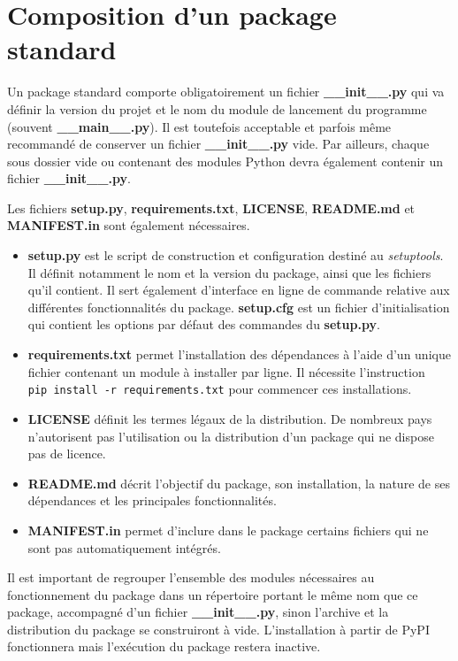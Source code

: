 \documentclass[twoside,a4paper,11pt,frenchb,openany]{report}
\begin{document}
\section{Composition d'un package standard}

Un package standard comporte obligatoirement un fichier \textbf{\_\_init\_\_.py} qui va définir la version du projet et le nom du module de lancement du programme (souvent \textbf{\_\_main\_\_.py}). Il est toutefois acceptable et parfois même recommandé de conserver un fichier \textbf{\_\_init\_\_.py} vide. Par ailleurs, chaque sous dossier vide ou contenant des modules Python devra également contenir un fichier \textbf{\_\_init\_\_.py}.

Les fichiers \textbf{setup.py}, \textbf{requirements.txt}, \textbf{LICENSE},  \textbf{README.md} et \textbf{MANIFEST.in} sont également nécessaires.  
\begin{itemize}
\item \textbf{setup.py} est le script de construction et configuration destiné au \textit{setuptools}. Il définit notamment le nom et la version du package, ainsi que les fichiers qu'il contient. Il sert également d'interface en ligne de commande relative aux différentes fonctionnalités du package. \textbf{setup.cfg} est un fichier d'initialisation qui contient les options par défaut des commandes du \textbf{setup.py}.
\item \textbf{requirements.txt} permet l'installation des dépendances à l'aide d'un unique fichier contenant un module à installer par ligne. Il nécessite l'instruction 
\texttt{  pip install -r requirements.txt}
pour commencer ces installations.
\item \textbf{LICENSE} définit les termes légaux de la distribution. De nombreux pays n'autorisent pas l'utilisation ou la distribution d'un package qui ne dispose pas de licence.
\item \textbf{README.md} décrit l'objectif du package, son installation, la nature de ses dépendances et les principales fonctionnalités.
\item \textbf{MANIFEST.in} permet d'inclure dans le package certains fichiers qui ne sont pas automatiquement intégrés. 
\end{itemize}

Il est important de regrouper l'ensemble des modules nécessaires au fonctionnement du package dans un répertoire portant le même nom que ce package, accompagné d'un fichier \textbf{\_\_init\_\_.py}, sinon l'archive et la distribution du package se construiront à vide. L'installation à partir de PyPI fonctionnera mais l'exécution du package restera inactive.
\end{document}
